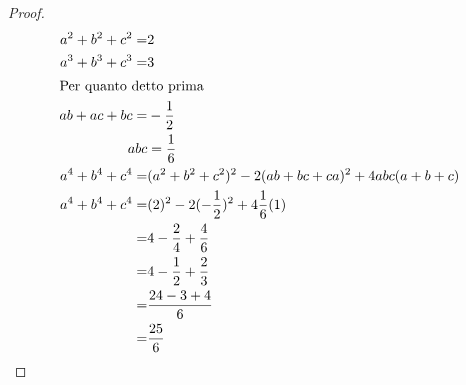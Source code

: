 \begin{proof}
\begin{align*}
	a^2+b^2+c^2=&2\\
	a^3+b^3+c^3=&3\\
	\intertext{Per quanto detto prima}
	ab+ac+bc=&-\dfrac{1}{2}\\
	abc&=\dfrac{1}{6}\\
	a^4+b^4+c^4=&(a^2+b^2+c^2)^2-2(ab+bc+ca)^2+4abc(a+b+c)\\
	a^4+b^4+c^4=&(2)^2-2(-\dfrac{1}{2})^2+4\dfrac{1}{6}(1)\\
	=&4-\dfrac{2}{4}+\dfrac{4}{6}\\
	=&4-\dfrac{1}{2}+\dfrac{2}{3}\\
	=&\dfrac{24-3+4}{6}\\
	=&\dfrac{25}{6}\\
\end{align*}
\end{proof}